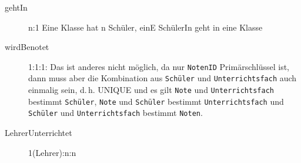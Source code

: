 \documentclass{lehramt-informatik-aufgabe}
\begin{document}
\begin{liAntwort}

\begin{description}
\item[gehtIn] n:1 Eine Klasse hat n Schüler, einE SchülerIn geht in eine
Klasse

\item[wirdBenotet]  1:1:1: Das ist anderes nicht möglich, da nur
\texttt{NotenID} Primärschlüssel ist, dann muss aber die Kombination aus
\texttt{Schüler} und \texttt{Unter\-richtsfach} auch einmalig sein, d.\,h.
UNIQUE und es gilt \texttt{Note} und \texttt{Unter\-richtsfach} bestimmt
\texttt{Schüler}, \texttt{Note} und \texttt{Schüler} bestimmt
\texttt{Unterrichtsfach} und \texttt{Schüler} und
\texttt{Unterrichtsfach} bestimmt
\texttt{Noten}.

\item[LehrerUnterrichtet] 1(Lehrer):n:n
\end{description}
\end{liAntwort}
\end{document}
